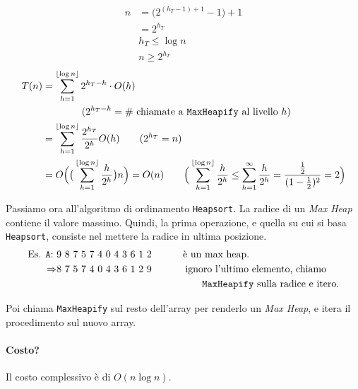 \begin{align*}
	n & = \Big( 2^{(h_T-1)+1} - 1\Big) + 1 \\
	& = 2^{h_T} \\
	& h_T \leq \log n \\
	& n \geq 2^{h_T}
\end{align*}
\begin{align*}
	T(n) & = \displaystyle\sum_{h = 1}^{\lfloor\log n\rfloor} 2^{h_T - h} \cdot O(h) \\
	& \hspace{1.4cm} (2^{h_T - h} = \text{\# chiamate a \texttt{MaxHeapify} al livello } h) \\
	& = \displaystyle\sum_{h = 1}^{\lfloor\log n\rfloor} \frac{2^{h_T}}{2^h}O(h) \qquad (2^{h_T} = n) \\
	& = O \Big( \big(\displaystyle\sum_{h = 1}^{\lfloor\log n\rfloor} \frac{h}{2^h} \big) n \Big) = O(n) 
		\qquad \Big( \displaystyle\sum_{h = 1}^{\lfloor\log n\rfloor} \frac{h}{2^h} \leq \displaystyle\sum_{h = 1}^{\infty} \frac{h}{2^h} 
		= \frac{\frac{1}{2}}{(1 - \frac{1}{2})^2} = 2 \Big)
\end{align*}


Passiamo ora all'algoritmo di ordinamento \texttt{Heapsort}. La radice di un 
\emph{Max Heap} contiene il valore massimo. Quindi, la prima operazione, e quella su cui si basa \texttt{Heapsort}, 
consiste nel mettere la radice in ultima posizione.
\begin{align*}
\text{Es. \texttt{A}: }& \text{9 8 7 5 7 4 0 4 3 6 1 2 \hspace{1cm}} \text{è un max heap.} \\
\Rightarrow & \text{8 7 5 7 4 0 4 3 6 1 2 9} \hspace{1.2cm} \text{ignoro l'ultimo elemento, chiamo} \\
& \hspace{5.2cm}\text{\texttt{MaxHeapify} sulla radice e itero.}
\end{align*}

Poi chiama \texttt{MaxHeapify} sul resto dell'array per renderlo un \emph{Max Heap}, e itera il procedimento 
sul nuovo array.



\paragraph{Costo?} Il costo complessivo è di $O(n \log n)$.

